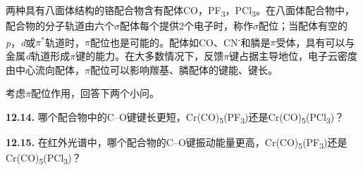 两种具有八面体结构的铬配合物含有配体CO，PF\textsubscript{3}，PCl\textsubscript{3}。在八面体配合物中，配合物的分子轨道由六个$\sigma$配体每个提供2个电子时，称作$\sigma$配位；当配体有空的\textit{p}，\textit{d}或$\pi^*$轨道时，$\pi$配位也是可能的。配体如CO、CN\textsuperscript{-}和膦是$\pi$受体，具有可以与金属\textit{d}轨道形成$\pi$键的能力。在大多数情况下，反馈$\pi$键占据主导地位，电子云密度由中心流向配体，$\pi$配位可以影响羰基、膦配体的键能、键长。

考虑$\pi$配位作用，回答下两个小问。

\noindent\textbf{12.14.}
哪个配合物中的C--O键键长更短，Cr(CO)\textsubscript{5}(PF\textsubscript{3})还是Cr(CO)\textsubscript{5}(PCl\textsubscript{3})？

\noindent\textbf{12.15.}
在红外光谱中，哪个配合物的C--O键振动能量更高，Cr(CO)\textsubscript{5}(PF\textsubscript{3})还是Cr(CO)\textsubscript{5}(PCl\textsubscript{3})？
